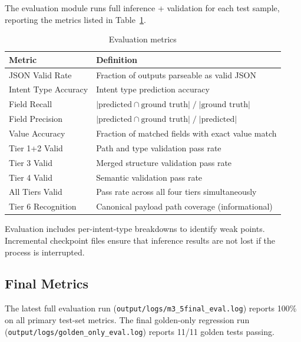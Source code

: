 \documentclass[12pt, a4paper]{article}
\begin{document}
The evaluation module runs full inference + validation for each test sample, reporting the metrics listed in Table~\ref{tab:eval-metrics}.

\begin{table}[H]
\centering
\caption{Evaluation metrics}
\label{tab:eval-metrics}
\small
\begin{tabular}{lp{9.5cm}}
\toprule
\textbf{Metric} & \textbf{Definition} \\
\midrule
JSON Valid Rate       & Fraction of outputs parseable as valid JSON \\
Intent Type Accuracy  & Intent type prediction accuracy \\
Field Recall          & $|\text{predicted} \cap \text{ground truth}| \;/\; |\text{ground truth}|$ \\
Field Precision       & $|\text{predicted} \cap \text{ground truth}| \;/\; |\text{predicted}|$ \\
Value Accuracy        & Fraction of matched fields with exact value match \\
Tier 1+2 Valid        & Path and type validation pass rate \\
Tier 3 Valid          & Merged structure validation pass rate \\
Tier 4 Valid          & Semantic validation pass rate \\
All Tiers Valid       & Pass rate across all four tiers simultaneously \\
Tier 6 Recognition    & Canonical payload path coverage (informational) \\
\bottomrule
\end{tabular}
\end{table}

\noindent
Evaluation includes per-intent-type breakdowns to identify weak points. Incremental checkpoint files ensure that inference results are not lost if the process is interrupted.

\subsection{Final Metrics}

The latest full evaluation run (\texttt{output/logs/m3\_5final\_eval.log}) reports 100\% on all primary test-set metrics. The final golden-only regression run (\texttt{output/logs/golden\_only\_eval.log}) reports 11/11 golden tests passing.
\end{document}
